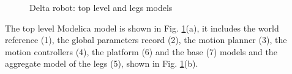 \documentclass[]{interact}
\theoremstyle{plain}%
\theoremstyle{definition}
\theoremstyle{remark}
\begin{document}
{\begin{figure}
\centering
{}
\caption{Delta robot: top level and legs models} \label{Fig:Delta_robot_Modelica_top_level}
\end{figure}
The top level Modelica model is shown in Fig. \ref{Fig:Delta_robot_Modelica_top_level}(a), it includes the world reference (1), the global parameters record (2), the motion planner (3), the motion controllers (4), the platform (6) and the base (7) models and the aggregate model of the legs (5), shown in Fig. \ref{Fig:Delta_robot_Modelica_top_level}(b).

}
\end{document}
